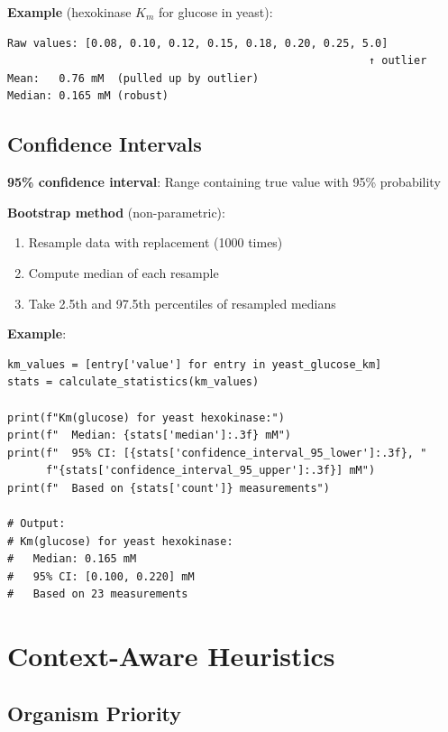 \textbf{Example} (hexokinase $K_m$ for glucose in yeast):

\begin{verbatim}
Raw values: [0.08, 0.10, 0.12, 0.15, 0.18, 0.20, 0.25, 5.0]
                                                        ↑ outlier
Mean:   0.76 mM  (pulled up by outlier)
Median: 0.165 mM (robust)
\end{verbatim}

\subsection{Confidence Intervals}
\label{subsec:confidence-intervals}

\textbf{95\% confidence interval}: Range containing true value with 95\% probability

\textbf{Bootstrap method} (non-parametric):

\begin{enumerate}
    \item Resample data with replacement (1000 times)
    \item Compute median of each resample
    \item Take 2.5th and 97.5th percentiles of resampled medians
\end{enumerate}

\textbf{Example}:

\begin{verbatim}
km_values = [entry['value'] for entry in yeast_glucose_km]
stats = calculate_statistics(km_values)

print(f"Km(glucose) for yeast hexokinase:")
print(f"  Median: {stats['median']:.3f} mM")
print(f"  95% CI: [{stats['confidence_interval_95_lower']:.3f}, "
      f"{stats['confidence_interval_95_upper']:.3f}] mM")
print(f"  Based on {stats['count']} measurements")

# Output:
# Km(glucose) for yeast hexokinase:
#   Median: 0.165 mM
#   95% CI: [0.100, 0.220] mM
#   Based on 23 measurements
\end{verbatim}

\section{Context-Aware Heuristics}
\label{sec:context-aware-heuristics}

\subsection{Organism Priority}
\label{subsec:organism-priority}

